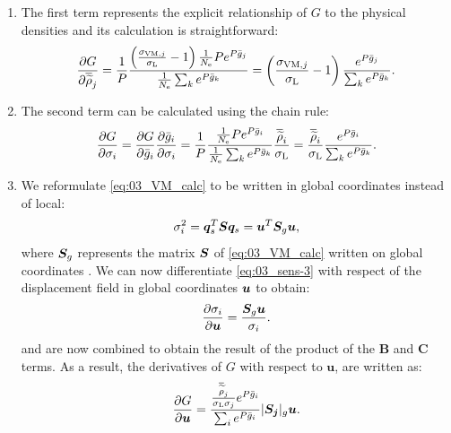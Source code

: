 \begin{enumerate}[label=\Alph* --]
    \item The first term represents the explicit relationship of $G$ to the physical densities and its calculation is straightforward: 
    \begin{equation} \label{eq:03_sens-2-1}
        \frac{\partial G}{\partial \overline{\widetilde{\rho}}_j} = \frac{1}{P} \frac{\left(\frac{ \sigma_{\text{VM},j}}{\sigma_\text{L}}-1 \right)\frac{1}{N_\text{e}} P e^{{P}\bar{g}_j}}{\frac{1}{N_\text{e}} \sum_k e^{{P}\bar{g}_k}} = \left(\frac{ \sigma_{\text{VM},j}}{\sigma_\text{L}}-1 \right) \frac{e^{{P}\bar{g}_j}}{\sum_k e^{{P}\bar{g}_k}}.
    \end{equation}
    
    \item The second term can be calculated using the chain rule:
    \begin{equation}
        \label{eq:03_sens-2-2}
        \frac{\partial G}{\partial\sigma_i} = \frac{\partial G}{\partial\bar{g}_i} \frac{\partial\bar{g}_i}{\partial\sigma_i} = \frac{1}{P} \frac{\frac{1}{N_\text{e}} P e^{{P}\bar{g}_i}}{\frac{1}{N_\text{e}} \sum_k e^{{P}\bar{g}_k}} \frac{\overline{\widetilde{\rho}}_i}{\sigma_\text{L}} = \frac{\overline{\widetilde{\rho}}_i}{\sigma_\text{L}} \frac{e^{{P}\bar{g}_i}}{\sum_k e^{{P}\bar{g}_k}}.
    \end{equation}
    
    \item We reformulate \eqref{eq:03_VM_calc}  to be written in global coordinates instead of local:
    \begin{equation}
        \label{eq:03_sens-3}
        \sigma_i^2 = \bm{q}_s^T\bm{S}\bm{q}_s = \bm{u}^T \bm{S}_g \bm{u},
    \end{equation}  
    where $\bm{S}_g$ represents the matrix $\bm{S}$ of \eqref{eq:03_VM_calc} written on global coordinates . We can now differentiate \eqref{eq:03_sens-3} with respect of the displacement field in global coordinates $\bm{u}$ to obtain:
    \begin{equation}
        \label{eq:03_sens-4}
        \frac{\partial\sigma_i}{\partial\bm{u}} = \frac{\bm{S}_g \bm{u}}{\sigma_i}.
    \end{equation}
     and  are now combined to obtain the result of the product of the \textbf{B} and \textbf{C} terms. As a result, the derivatives of $G$ with respect to $\bm{u}$, are written as:
    \begin{equation} \label{eq:03_sens-4-1}
        \frac{\partial G}{\partial\bm{u}} = \frac{\frac{\overline{\widetilde{\rho}}_j}{\sigma_\text{L}\sigma_j} e^{{P}\bar{g}_i}}{\sum_i e^{{P}\bar{g}_i}} |\bm{S_j}|_g \bm{u}.
    \end{equation}


\end{enumerate}

